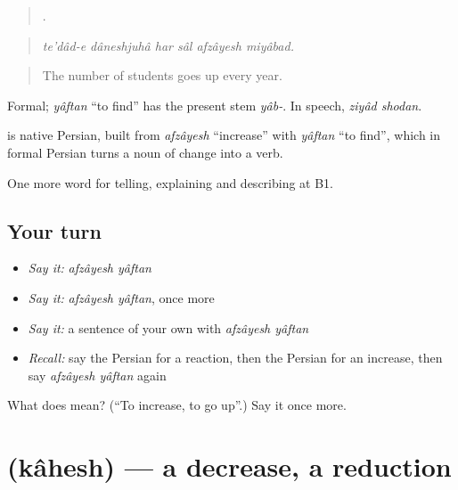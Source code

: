 \begin{quote}
     .
\end{quote}

\begin{quote}
\emph{te'dâd-e dâneshjuhâ har sâl afzâyesh miyâbad.}
\end{quote}

\begin{quote}
The number of students goes up every year.
\end{quote}

Formal; \emph{yâftan} \textquotedblleft{}to find\textquotedblright{} has the present stem \emph{yâb-}. In speech, \emph{ziyâd shodan}.

\begin{cousinweb}
\textbf{ } is native Persian, built from \emph{afzâyesh} \textquotedblleft{}increase\textquotedblright{} with \emph{yâftan} \textquotedblleft{}to find\textquotedblright{}, which in formal Persian turns a noun of change into a verb.
\end{cousinweb}

\begin{grammarlens}[title={What you've built}]
One more word for telling, explaining and describing at B1.
\end{grammarlens}

\subsection*{Your turn}
\begin{itemize}
\raggedright
  \item \emph{Say it:} \emph{afzâyesh yâftan}
  \item \emph{Say it:} \emph{afzâyesh yâftan}, once more
  \item \emph{Say it:} a sentence of your own with \emph{afzâyesh yâftan}
  \item \emph{Recall:} say the Persian for a reaction, then the Persian for an increase, then say \emph{afzâyesh yâftan} again
\end{itemize}

\begin{tcolorbox}[breakable,colback=teal!4,colframe=teal!35!black,title={Before you move on}]
What does   mean? (\textquotedblleft{}To increase, to go up\textquotedblright{}.) Say it once more.
\end{tcolorbox}
\section[\texorpdfstring{\fa{کاهش} (kâhesh)}{کاهش (kâhesh)}]{ (kâhesh) — a decrease, a reduction}

